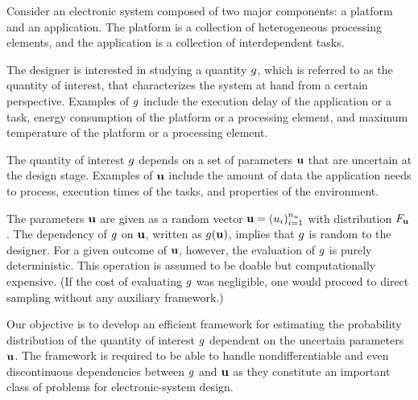 Consider an electronic system composed of two major components: a platform and
an application. The platform is a collection of heterogeneous processing
elements, and the application is a collection of interdependent tasks.

The designer is interested in studying a quantity $g$, which is referred to as
the quantity of interest, that characterizes the system at hand from a certain
perspective. Examples of $g$ include the execution delay of the application or
a task, energy consumption of the platform or a processing element, and maximum
temperature of the platform or a processing element.

The quantity of interest $g$ depends on a set of parameters $\mathbf{u}$ that are
uncertain at the design stage. Examples of $\mathbf{u}$ include the amount of data the
application needs to process, execution times of the tasks, and properties of
the environment.

The parameters $\mathbf{u}$ are given as a random vector $\mathbf{u} = (u_i)_{i = 1}^{n_u}$
with distribution $F_{\mathbf{u}}$. The dependency of $g$ on $\mathbf{u}$, written
as $g(\mathbf{u})$, implies that $g$ is random to the designer. For a given outcome
of $\mathbf{u}$, however, the evaluation of $g$ is purely deterministic. This
operation is assumed to be doable but computationally expensive. (If the cost of
evaluating $g$ was negligible, one would proceed to direct sampling without any
auxiliary framework.)

Our objective is to develop an efficient framework for estimating the
probability distribution of the quantity of interest $g$ dependent on the
uncertain parameters $\mathbf{u}$. The framework is required to be able to handle
nondifferentiable and even discontinuous dependencies between $g$ and $\mathbf{u}$ as
they constitute an important class of problems for electronic-system design.
